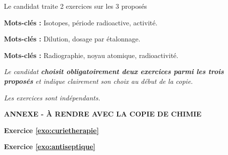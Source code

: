 \newpage
\vAligne{-70pt}

\begin{boite}
  \centering
  Le candidat traite  2 exercices sur les 3 proposés

  \begin{multicols}{3}
    \begin{boite}
      \begin{center}
      \end{center}
      \vspace*{-12pt}
      \textbf{Mots-clés :} Isotopes, période radioactive, activité.
    \end{boite}
    \begin{boite}
      \begin{center}
      \end{center}
      \vspace*{-12pt}
      \textbf{Mots-clés :} Dilution, dosage par étalonnage.
    \end{boite}
    \begin{boite}
      \begin{center}
      \end{center}
      \vspace*{-12pt}
      \textbf{Mots-clés :} Radiographie, noyau atomique, radioactivité.
    \end{boite}
  \end{multicols}
\end{boite}

\textit{
  Le candidat \textbf{choisit obligatoirement deux exercices parmi les trois proposés} et indique clairement son choix au début de la copie.
}
  
\textit{
  Les exercices sont indépendants.
}
\vspace*{24pt}


\vspace*{-4pt}


\newpage


\vspace*{2cm}



\newpage
\begin{boite}
  \centering
  \textbf{ANNEXE - À RENDRE AVEC LA COPIE DE CHIMIE}
\end{boite}

\textbf{Exercice \ref{exo:curietherapie}}
\begin{center}
\end{center}

\textbf{Exercice \ref{exo:antiseptique}}
\begin{center}
\end{center}
%